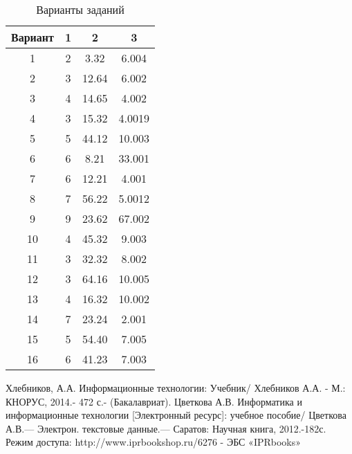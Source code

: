 \documentclass[a4paper]{article}
\begin{document}
\begin{table}[h]
      \caption{Варианты заданий}
      \begin{center}\label{tab:variant}
      \begin{tabular}{|c|ccc|}
        \hline
        Вариант & 1 & 2 & 3 \\
        \hline
        1 & 2 & 3.32 & 6.004\\
        \hline
        2 & 3 & 12.64 & 6.002\\
        \hline
        3 & 4 & 14.65 & 4.002\\
        \hline
        4 & 3 & 15.32 & 4.0019\\
        \hline
        5 & 5 & 44.12 & 10.003\\
        \hline
        6 & 6 & 8.21 & 33.001\\
        \hline
        7 & 6 & 12.21 & 4.001\\
        \hline
        8 & 7 & 56.22 & 5.0012\\
        \hline
        9 & 9 & 23.62 & 67.002\\
        \hline
        10 & 4 & 45.32 & 9.003 \\
        \hline
        11 & 3 & 32.32 & 8.002 \\
        \hline
        12 & 3 & 64.16 & 10.005\\
        \hline
        13 & 4 & 16.32 & 10.002\\
        \hline
        14 & 7 & 23.24 & 2.001\\
        \hline
        15 & 5 & 54.40 & 7.005\\
        \hline
        16 & 6 & 41.23 & 7.003\\
        \hline
      \end{tabular}
    \end{center}
\end{table}

\newpage
\begin{thebibliography}{3}
    Хлебников, А.А. Информационные технологии: Учебник/ Хлебников А.А. - М.: КНОРУС, 2014.- 472 с.- (Бакалавриат).
Цветкова А.В. Информатика и информационные технологии [Электронный ресурс]: учебное пособие/ Цветкова А.В.— Электрон. текстовые данные.— Саратов: Научная книга, 2012.-182с. Режим доступа: http://www.iprbookshop.ru/6276 - ЭБС «IPRbooks»

\end{thebibliography}
\end{document}
